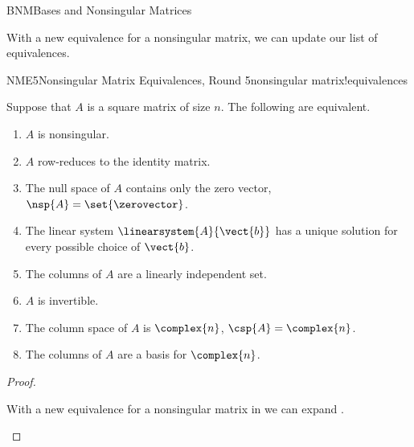 \begin{subsect}{BNM}{Bases and Nonsingular Matrices}
%
\begin{para}With a new equivalence for a nonsingular matrix, we can update our list of equivalences.\end{para}
%
\begin{theorem}{NME5}{Nonsingular Matrix Equivalences, Round 5}{nonsingular matrix!equivalences}
\begin{para}Suppose that $A$ is a square matrix of size $n$.  The following are equivalent.
%
\begin{enumerate}
\item $A$ is nonsingular.
\item $A$ row-reduces to the identity matrix.
\item The null space of $A$ contains only the zero vector, $\nsp{A}=\set{\zerovector}$.
\item The linear system $\linearsystem{A}{\vect{b}}$ has a unique solution for every possible choice of $\vect{b}$.
\item The columns of $A$ are a linearly independent set.
\item $A$ is invertible.
\item The column space of $A$ is $\complex{n}$, $\csp{A}=\complex{n}$.
\item The columns of $A$ are a basis for $\complex{n}$.
\end{enumerate}
\end{para}
\end{theorem}
%
\begin{proof}
\begin{para}With a new equivalence for a nonsingular matrix in  we can expand .\end{para}
\end{proof}
%
%
\end{subsect}
%

